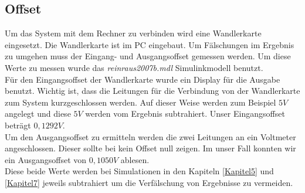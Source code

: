 \subsection{Offset}
Um das System mit dem Rechner zu verbinden wird eine Wandlerkarte eingesetzt. Die Wandlerkarte ist im PC eingebaut. Um Fälschungen im Ergebnis zu umgehen muss der Eingang- und Ausgangsoffset gemessen werden. Um diese Werte zu messen wurde das \textit{reinraus2007b.mdl} Simulinkmodell benutzt.\\

Für den Eingangsoffset der Wandlerkarte wurde ein Display für die Ausgabe benutzt. Wichtig ist, dass die Leitungen für die Verbindung von der Wandlerkarte zum System kurzgeschlossen werden. Auf dieser Weise werden zum Beispiel $5V$ angelegt und diese $5V$ werden vom Ergebnis subtrahiert. Unser Eingangsoffset beträgt $0,1292V$.\\

Um den Ausgangsoffset zu ermitteln werden die zwei Leitungen an ein Voltmeter angeschlossen. Dieser sollte bei kein Offset null zeigen. Im unser Fall konnten wir ein Ausgangsoffset von $0,1050V$ ablesen.\\

Diese beide Werte werden bei Simulationen in den Kapiteln \ref{Kapitel5} und \ref{Kapitel7} jeweils  subtrahiert um die Verfälschung von Ergebnisse zu vermeiden.



